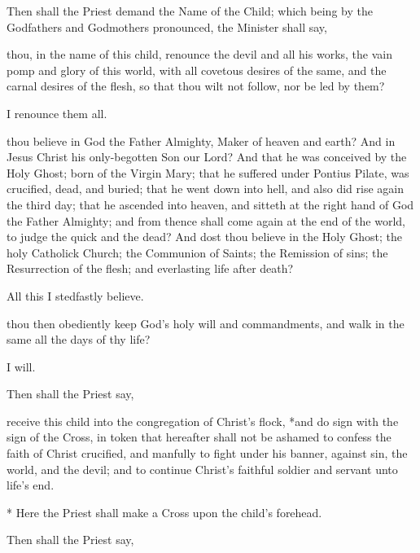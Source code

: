 \begin{rubric}
Then shall the Priest demand the Name of the Child; which being by the Godfathers and Godmothers pronounced, the Minister shall say,
\end{rubric}

 thou, in the name of this child, renounce the devil and all his works, the vain pomp and glory of this world, with all covetous desires of the same, and the carnal desires of the flesh, so that thou wilt not follow, nor be led by them?

 I renounce them all.

 thou believe in God the Father Almighty, Maker of heaven and earth?
And in Jesus Christ his only-begotten Son our Lord?
And that he was conceived by the Holy Ghost; born of the Virgin Mary; that he suffered under Pontius Pilate, was crucified, dead, and buried; that he went down into hell, and also did rise again the third day; that he ascended into heaven, and sitteth at the right hand of God the Father Almighty; and from thence shall come again at the end of the world, to judge the quick and the dead?
And dost thou believe in the Holy Ghost; the holy Catholick Church; the Communion of Saints; the Remission of sins; the Resurrection of the flesh; and everlasting life after death?

 All this I stedfastly believe.

 thou then obediently keep God's holy will and commandments, and walk in the same all the days of thy life?

 I will.

\newpage

\begin{rubric}
Then shall the Priest say,
\end{rubric}

 receive this child into the congregation of Christ's flock, *and do sign  with the sign of the Cross, in token that hereafter  shall not be ashamed to confess the faith of Christ crucified, and manfully to fight under his banner, against sin, the world, and the devil; and to continue Christ's faithful soldier and servant unto  life's end.
\begin{secrubric}
* Here the Priest shall make a Cross upon the child's forehead.
\end{secrubric}

\begin{rubric}
Then shall the Priest say,
\end{rubric}

